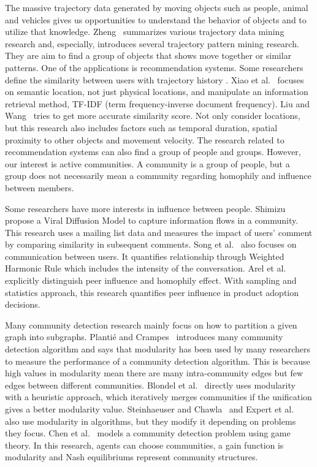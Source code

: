 \documentclass{article}
\begin{document}
The massive trajectory data generated by moving objects such as people, animal and vehicles gives us opportunities to understand the behavior of objects and to utilize that knowledge. Zheng~ summarizes various trajectory data mining research and, especially, introduces several trajectory pattern mining research. They are aim to find a group of objects that shows move together or similar patterns. One of the applications is recommendation systems. Some researchers define the similarity between users with trajectory history \cite{Xiao2014,Liu2016}. Xiao et al.~ focuses on semantic location, not just physical locations, and manipulate an information retrieval method, TF-IDF (term frequency-inverse document frequency). Liu and Wang~ tries to get more accurate similarity score. Not only consider locations, but this research also includes factors such as temporal duration, spatial proximity to other objects and movement velocity. The research related to recommendation systems can also find a group of people and groups. However, our interest is active communities. A community is a group of people, but a group does not necessarily mean a community regarding homophily and influence between members.

Some researchers have more interests in influence between people. Shimizu~ propose a Viral Diffusion Model to capture information flows in a community. This research uses a mailing list data and measures the impact of users' comment by comparing similarity in subsequent comments. Song et al.~ also focuses on communication between users. It quantifies relationship through Weighted Harmonic Rule which includes the intensity of the conversation. Arel et al.~ explicitly distinguish peer influence and homophily effect. With sampling and statistics approach, this research quantifies peer influence in product adoption decisions.

Many community detection research mainly focus on how to partition a given graph into subgraphs. Planti{\'e} and Crampes~ introduces many community detection algorithm and says that modularity has been used by many researchers to measure the performance of a community detection algorithm. This is because high values in modularity mean there are many intra-community edges but few edges between different communities. Blondel et al.~ directly uses modularity with a heuristic approach, which iteratively merges communities if the unification gives a better modularity value. Steinhaeuser and Chawla~ and Expert et al.~ also use modularity in algorithms, but they modify it depending on problems they focus. Chen et al.~ models a community detection problem using game theory. In this research, agents can choose communities, a gain function is modularity and Nash equilibriums represent community structures.
\end{document}
